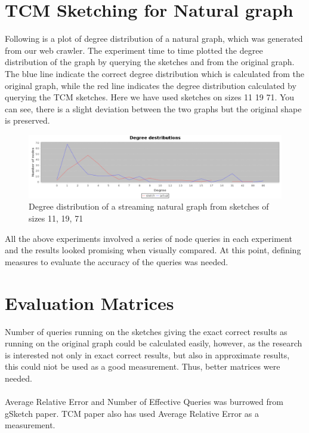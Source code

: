 \documentclass[12pt]{report}
\numberwithin{figure}{section}
\numberwithin{table}{section}
\begin{document}
\section{TCM Sketching for Natural graph}
Following is a plot of degree distribution of a natural graph, which was generated from our web crawler. The experiment time to time plotted the degree distribution of the graph by querying the sketches and from the original graph. The blue line indicate the correct degree distribution which is calculated from the original graph, while the red line indicates the degree distribution calculated by querying the TCM sketches. Here we have used sketches on sizes 11 19 71. You can see, there is a slight deviation between the two graphs but the original shape is preserved.

\begin{figure}[H]
\centering
\includegraphics[scale=0.3]{images/ddn}
\caption{Degree distribution of a streaming natural graph from sketches of sizes 11, 19, 71}
\end{figure}

All the above experiments involved a series of node queries in each experiment and the results looked promising when visually compared. At this point, defining measures to evaluate the accuracy of the queries was needed. 

\section{Evaluation Matrices}
Number of queries running on the sketches giving the exact correct results as running on the original graph could be calculated easily, however, as the research is interested not only in exact correct results, but also in approximate results, this could niot be used as a good measurement. Thus, better matrices were needed.

\paragraph{}

Average Relative Error and Number of Effective Queries was burrowed from gSketch paper. TCM paper also has used Average Relative Error as a measurement. 
\end{document}
